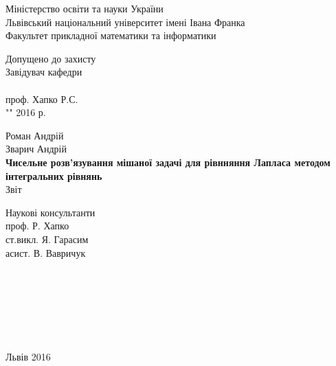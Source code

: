 \documentclass[a4 paper,12pt,ukrainian]{report}
\begin{document}
\titlepage
\begin{center}
\large {Міністерство освіти та науки України}\\
\large {Львівський національний університет імені Івана Франка}\\
\large {Факультет прикладної математики та інформатики}\\
\end{center}

\normalsize \vspace*{2cm}
\hspace*{11cm}Допущено до захисту\\
\hspace*{11cm}Завідувач кафедри\\
\hspace*{11cm}\underline{\hspace{3cm}}\\
\hspace*{11cm}проф. Хапко Р.С.\\
\hspace*{11cm}"\underline{\hspace{0.5cm}}"\underline{\hspace{2cm}} 2016 р.
\normalsize \vspace*{2cm}
\begin{center}
\large{Роман Андрій}\\
\large{Зварич Андрій}\\
\large{\textbf{Чисельне розв'язування мішаної задачі для рівнняння Лапласа методом інтегральних рівнянь}}\\
\large{Звіт}\\
\end{center}
\normalsize \vspace*{3cm}
\hspace*{11cm}Наукові консультанти\\
\hspace*{11cm}проф. Р. Хапко\\
\hspace*{11cm}ст.викл. Я. Гарасим\\
\hspace*{11cm}асист. В. Вавричук\\
\\
\\
\\
\\
\\
\\
\large\centerline{Львів 2016}
\tableofcontents
\end{document}
